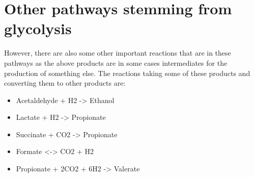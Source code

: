 \documentclass[11pt]{article}
\begin{document}
\section{Other pathways stemming from glycolysis}
\label{sec:org9400f29}
However, there are also some other important reactions that are in these pathways as the above products are in some cases intermediates for the production of something else. The reactions taking some of these products and converting them to other products are: 

\begin{itemize}
\item Acetaldehyde + H2 -> Ethanol
\item Lactate + H2 -> Propionate
\item Succinate + CO2 -> Propionate
\item Formate <-> CO2 + H2
\item Propionate + 2CO2 + 6H2 -> Valerate
\end{itemize}
\end{document}

